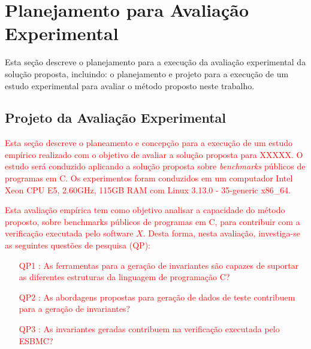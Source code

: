 \section{Planejamento para Avaliação Experimental}
\label{sec:plan-experimentos}



Esta seção descreve o planejamento para a execução da avaliação experimental da solução proposta, incluindo: o planejamento e projeto para a execução de um estudo experimental para avaliar o método proposto 
neste trabalho.


\subsection{Projeto da Avaliação Experimental}
\label{sub:experimento}


\textcolor{red}{Esta seção descreve o planeamento e concepção para a execução de um estudo empírico realizado com o objetivo de avaliar a solução proposta para \textcolor{red}{XXXXX}. O estudo será conduzido aplicando a solução proposta sobre \textit{benchmarks} públicos de programas em C. Os experimentos foram conduzidos em um computador Intel Xeon CPU E5, 2.60GHz, 115GB RAM com Linux 3.13.0 - 35-generic x86\_64.}


\textcolor{red}{Esta avaliação empírica tem como objetivo analisar a capacidade do método proposto, sobre benchmarks públicos de programas em C, para contribuir com a verificação executada pelo software $X$. Desta forma, nesta avaliação, investiga-se as seguintes questões de pesquisa (QP):
%
\begin{itemize}
    \item[QP1]: As ferramentas para a geração de invariantes são capazes de suportar as diferentes estruturas da linguagem de programação C?
    \item[QP2]: As abordagens propostas para geração de dados de teste contribuem para a geração de invariantes?
    \item[QP3]: As invariantes geradas contribuem na verificação executada pelo ESBMC?
\end{itemize}}



